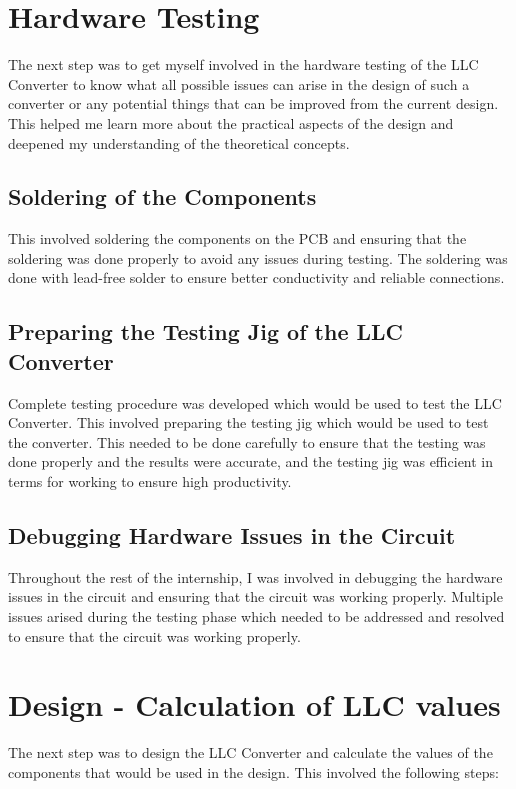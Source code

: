 \section{Hardware Testing}
The next step was to get myself involved in the hardware testing of the LLC Converter to know what
all possible issues can arise in the design of such a converter or any potential things that can be
improved from the current design.\\
This helped me learn more about the practical aspects of the design and deepened my understanding of the theoretical concepts.

\subsection{Soldering of the Components}
This involved soldering the components on the PCB and ensuring that the soldering was done properly to avoid any issues during testing.
The soldering was done with lead-free solder to ensure better conductivity and reliable connections.
\subsection{Preparing the Testing Jig of the LLC Converter}
Complete testing procedure was developed which would be used to test the LLC Converter. This involved preparing the testing jig which would be used to test the converter.
This needed to be done carefully to ensure that the testing was done properly and the results were accurate, and the testing jig was efficient in terms for working to ensure high productivity.

\subsection{Debugging Hardware Issues in the Circuit}
Throughout the rest of the internship, I was involved in debugging the hardware issues in the circuit and ensuring that the circuit was working properly.
Multiple issues arised during the testing phase which needed to be addressed and resolved to ensure that the circuit was working properly.

\section{Design - Calculation of LLC values}
The next step was to design the LLC Converter and calculate the values of the components that would be used in the design. This involved the following steps:

